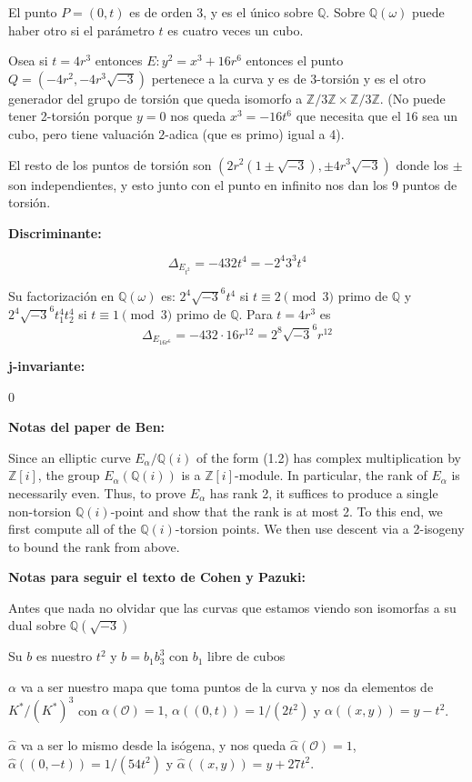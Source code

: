 \documentclass[12pt]{amsart}
\newcommand{\QQ}{\mathbb{Q}}
\newcommand{\ZZ}{\mathbb{Z}}
\newcommand{\OO}{\mathcal{O}}
\theoremstyle{plain}
\begin{document}
El punto $P=(0,t)$ es de orden $3$, y es el único sobre $\QQ$. Sobre $\QQ(\omega)$ puede haber otro si el parámetro $t$ es cuatro veces un cubo.

Osea si $t = 4r^3$ entonces $E: y^2=x^3+16r^6$ entonces el punto $Q=(-4r^2 , -4r^3 \sqrt{-3})$ pertenece a la curva y es de 3-torsión y es el otro generador del grupo de torsión que queda isomorfo a $\ZZ/3\ZZ \times \ZZ/3\ZZ$. (No puede tener 2-torsión porque $y=0$ nos queda $x^3=-16t^6$ que necesita que el $16$ sea un cubo, pero tiene valuación $2$-adica (que es primo) igual a 4).

El resto de los puntos de torsión son $(2r^2(1\pm\sqrt{-3}), \pm 4r^3 \sqrt{-3})$ donde los $\pm$ son independientes, y esto junto con el punto en infinito nos dan los 9 puntos de torsión.

\textbf{Discriminante:}

\[
\Delta_{E_{t^2}} = -432t^4 = -2^4 3^3 t^4
\]

Su factorización en $\QQ(\omega)$ es: $2^4 \sqrt{-3}^6 t^4$ si $t\equiv 2 \pmod 3$ primo de $\QQ$ y $2^4 \sqrt{-3}^6 t_1^4 t_2^4$ si $t\equiv 1 \pmod 3$ primo de $\QQ$. Para $t=4r^3$ es
\[
\Delta_{E_{16r^6}} = -432\cdot 16r^{12} = 2^8 \sqrt{-3}^6 r^{12}
\]

\textbf{j-invariante:}

0

\textbf{Notas del paper de Ben:}

Since an elliptic curve $E_\alpha/\QQ(i)$ of the form (1.2) has complex multiplication by $\ZZ[i]$, the group $E_\alpha(\QQ(i))$ is a $\ZZ[i]$-module. In particular, the rank of $E_\alpha$ is necessarily even. Thus,
to prove $E_\alpha$ has rank 2, it suffices to produce a single non-torsion $\QQ(i)$-point and show that
the rank is at most 2. To this end, we first compute all of the $\QQ(i)$-torsion points. We then
use descent via a 2-isogeny to bound the rank from above.

\textbf{Notas para seguir el texto de Cohen y Pazuki:}

Antes que nada no olvidar que las curvas que estamos viendo son isomorfas a su dual sobre $\QQ(\sqrt{-3})$

Su $b$ es nuestro $t^2$ y $b=b_1b_3^3$ con $b_1$ libre de cubos

$\alpha$ va a ser nuestro mapa que toma puntos de la curva y nos da elementos de $K^*/{(K^*)}^3$ con $\alpha(\OO)=1$, $\alpha((0, t)) = 1/(2t^2)$ y $\alpha((x, y)) = y-t^2$.

$\hat\alpha$ va a ser lo mismo desde la isógena, y nos queda $\hat\alpha(\OO)=1$, $\hat\alpha((0, -t)) = 1/(54t^2)$ y $\hat\alpha((x, y)) = y+27t^2$.
\end{document}
